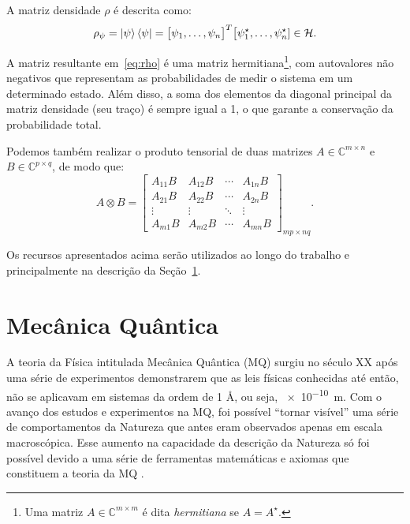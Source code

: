 A matriz densidade $\rho$ é descrita como:
\begin{equation}\label{eq:rho}
\rho_{\psi} = \ket{\psi}\bra{\psi} = \bigl[\psi_1,\ldots,\psi_n\bigr]^{T} \bigl[\psi_1^{\star},\ldots,\psi_n^{\star}] \in \mathcal{H}.
\end{equation}

A matriz resultante em~\eqref{eq:rho} é uma matriz hermitiana\footnote{Uma matriz \(A \in \mathbb{C}^{m{\times}m}\) é dita \textit{hermitiana} se \(A  = A^{\!\star}\).}, com autovalores não negativos que representam as probabilidades de medir o sistema em um determinado estado. Além disso, a soma dos elementos da diagonal principal da matriz densidade (seu traço) é sempre igual a 1, o que garante a conservação da probabilidade total.

Podemos também realizar o produto tensorial de duas matrizes \(A\in\mathbb{C}^{m{\times}n}\) e \(B\in\mathbb{C}^{p{\times}q}\), de modo que:
\begin{equation}\label{eq:tensormatrix}
  A \otimes B = \begin{bmatrix}
                  A_{11} B  & A_{12} B  & \cdots & A_{1 n} B \\
                  A_{21} B  & A_{22} B  & \cdots & A_{2 n} B \\
                  \vdots    & \vdots    & \ddots & \vdots    \\
                  A_{m 1} B & A_{m 2} B & \cdots & A_{m n} B
                \end{bmatrix}_{m p \times n q}.
              \end{equation}

Os recursos apresentados acima serão utilizados ao longo do trabalho e principalmente na descrição da Seção~\ref{sec:Mecanicaquantica}.

\section{Mecânica Quântica}\label{sec:Mecanicaquantica}

A teoria da Física intitulada Mecânica Quântica (MQ) surgiu no século XX após uma série de experimentos demonstrarem que as leis físicas conhecidas até então, não se aplicavam em sistemas da ordem de 1 \AA, ou seja, \SI{e-10}{\meter}. Com o avanço dos estudos e experimentos na MQ, foi possível ``tornar visível'' uma série de comportamentos da Natureza que antes eram observados apenas em escala macroscópica. Esse aumento na capacidade da descrição da Natureza só foi possível devido a uma série de ferramentas matemáticas e axiomas que constituem a teoria da MQ \cite{jorcuvich}.

